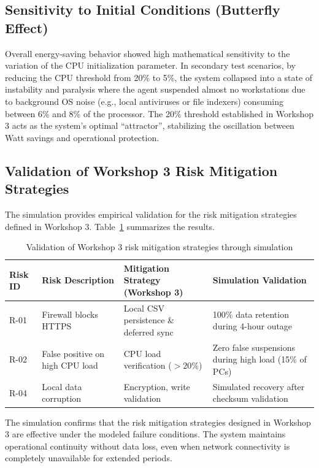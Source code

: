 \documentclass[12pt,a4paper]{article}
\begin{document}
\subsection{Sensitivity to Initial Conditions (Butterfly Effect)}
Overall energy-saving behavior showed high mathematical sensitivity to the variation of the CPU initialization parameter. In secondary test scenarios, by reducing the CPU threshold from 20\% to 5\%, the system collapsed into a state of instability and paralysis where the agent suspended almost no workstations due to background OS noise (e.g., local antiviruses or file indexers) consuming between 6\% and 8\% of the processor. The 20\% threshold established in Workshop 3 acts as the system's optimal ``attractor'', stabilizing the oscillation between Watt savings and operational protection.

\subsection{Validation of Workshop 3 Risk Mitigation Strategies}

The simulation provides empirical validation for the risk mitigation strategies defined in Workshop 3. Table~\ref{tab:risk_validation} summarizes the results.

\begin{table}[H]
\centering
\caption{Validation of Workshop 3 risk mitigation strategies through simulation}
\label{tab:risk_validation}
\begin{tabular}{|p{2cm}|p{4cm}|p{3cm}|p{3cm}|}
\hline
\textbf{Risk ID} & \textbf{Risk Description} & \textbf{Mitigation Strategy (Workshop 3)} & \textbf{Simulation Validation} \\
\hline
R-01 & Firewall blocks HTTPS & Local CSV persistence \& deferred sync &  100\% data retention during 4-hour outage \\
\hline
R-02 & False positive on high CPU load & CPU load verification (\(>20\%\)) &  Zero false suspensions during high load (15\% of PCs) \\
\hline
R-04 & Local data corruption & Encryption, write validation &  Simulated recovery after checksum validation \\
\hline
\end{tabular}
\end{table}

The simulation confirms that the risk mitigation strategies designed in Workshop 3 are effective under the modeled failure conditions. The system maintains operational continuity without data loss, even when network connectivity is completely unavailable for extended periods.
\end{document}
